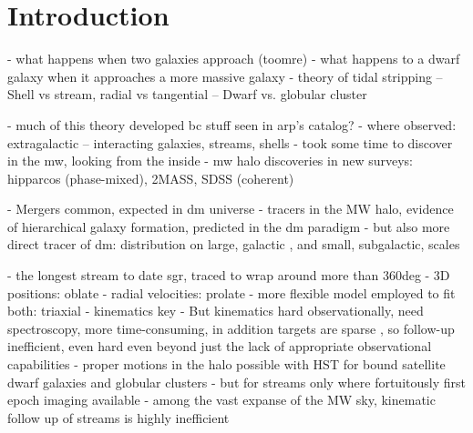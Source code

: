 \documentclass[final,5p,times,twocolumn,authoryear]{elsarticle}
\begin{document}
\begin{frontmatter}
%

\begin{keyword}



\end{keyword}

\end{frontmatter}


\section{Introduction}
\label{sec:intro}

- what happens when two galaxies approach (toomre)
- what happens to a dwarf galaxy when it approaches a more massive galaxy
- theory of tidal stripping
-- Shell vs stream, radial vs tangential
-- Dwarf vs. globular cluster

- much of this theory developed bc stuff seen in arp's catalog?
- where observed: extragalactic -- interacting galaxies, streams, shells
- took some time to discover in the mw, looking from the inside
- mw halo discoveries in new surveys: hipparcos (phase-mixed), 2MASS, SDSS (coherent)

- Mergers common, expected in dm universe
- tracers in the MW halo, evidence of hierarchical galaxy formation, predicted in the dm paradigm
- but also more direct tracer of dm: distribution on large, galactic \citep{varghese, bonaca:2014}, and small, subgalactic, scales \citep{johnston, ibata}

- the longest stream to date sgr, traced to wrap around more than 360deg \citep{majewski, belokurov}
- 3D positions: oblate \citep{johnston}
- radial velocities: prolate \citep{helmi}
- more flexible model employed to fit both: triaxial \citep{law, lmj}
- kinematics key \citep{bh:2018, nibauer, pearson}
- But kinematics hard observationally, need spectroscopy, more time-consuming, in addition targets are sparse \citep{kuzma, etc}, so follow-up inefficient, even hard even beyond just the lack of appropriate observational capabilities
- proper motions in the halo possible with HST for bound satellite dwarf galaxies and globular clusters \citep{kallivayalil, vdmarel, sohn, watkins}
- but for streams only where fortuitously first epoch imaging available \citep{sohn}
- among the vast expanse of the MW sky, kinematic follow up of streams is highly inefficient
\end{document}
